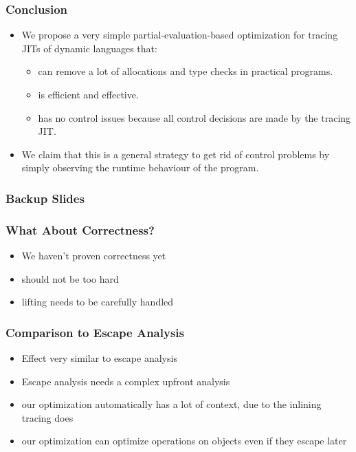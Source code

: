 \documentclass[utf8x]{beamer}
\begin{document}
\begin{frame}
  \frametitle{Conclusion}
  \begin{itemize}
      \item We propose a very simple partial-evaluation-based optimization for tracing
      JITs of dynamic languages that:
      \begin{itemize}
          \item can remove a lot of allocations and type checks in practical
          programs. 
          \item is efficient and effective.
          \item has no control issues because all control decisions are made by
          the tracing JIT.
      \end{itemize}
      \pause
      \item We claim that this is a general strategy to get rid of control
      problems by simply observing the runtime behaviour of the program.
  \end{itemize}
\end{frame}


\begin{frame}
  \frametitle{Backup Slides}
\end{frame}

\begin{frame}
  \frametitle{What About Correctness?}
  \begin{itemize}
      \item We haven't proven correctness yet
      \item should not be too hard
      \item lifting needs to be carefully handled
  \end{itemize}
\end{frame}

\begin{frame}
  \frametitle{Comparison to Escape Analysis}
  \begin{itemize}
      \item Effect very similar to escape analysis
      \item Escape analysis needs a complex upfront analysis
      \item our optimization automatically has a lot of context, due to the inlining tracing does
      \item our optimization can optimize operations on objects even if they escape later
  \end{itemize}
\end{frame}
\end{document}
